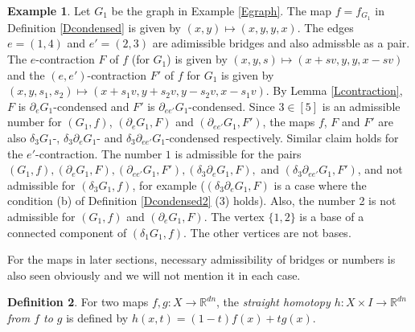 \documentclass[reqno]{amsart}
\theoremstyle{definition}
\newtheorem{defi}{Definition}[section]
\newtheorem{exa}[defi]{Example}
\theoremstyle{plain}
\newcommand{\RR}{\mathbb{R}}
\begin{document}
\begin{exa}\label{Ef_G}
Let $G_1$ be the graph in Example \ref{Egraph}.
The map $f=f_{G_1}$ in Definition \ref{Dcondensed} is given by $(x,y)\mapsto (x,y,y,x)$. The edges $e=(1,4)$ and $e'=(2,3)$ are adimissible bridges and also admissble as a pair. The $e$-contraction $F$ of $f$ (for $G_1$) is given by $(x,y,s)\mapsto (x+sv,y,y, x-sv)$ and the $(e,e')$-contraction $F'$ of $f$ for $G_1$ is given by $(x,y,s_1,s_2)\mapsto (x+s_1v, y+s_2v, y-s_2v, x-s_1v)$. By Lemma \ref{Lcontraction}, $F$  is  $\partial_eG_1$-condensed and $F'$ is $\partial_{ee'}G_1$-condensed.  
Since $3\in [5]$ is an admissible number for $(G_1,f)$, $(\partial_eG_1,F)$ and $(\partial_{ee'}G_1,F')$, the maps $f$, $F$ and $F'$ are also $\delta_3G_1$-, $\delta_3\partial_eG_1$- and  $\delta_3\partial_{ee'}G_1$-condensed respectively.  Similar claim holds for the $e'$-contraction. The number $1$ is admissible for the pairs $(G_1,f), (\partial_eG_1,F), (\partial_{ee'}G_1, F'), (\delta_3\partial_eG_1,F),$ and $(\delta_3\partial_{ee'}G_1,F')$,  and not admissible for $(\delta_3G_1,f)$, for example ($ (\delta_3\partial_eG_1,F)$ is a case where the condition (b) of Definition \ref{Dcondensed2} (3) holds). Also, the number 2 is not admissible for $(G_1,f)$ and $(\partial_eG_1,F)$.  The vertex $\{1,2\}$ is a base of a connected component of $(\delta_1G_1,f)$. The other vertices  are not bases. 





\end{exa}
For the maps in later sections, necessary admissibility of bridges or numbers is also seen obviously and we will not mention it in each case.  
\begin{defi}\label{Dstraight}
 For two  maps $f,g:X\to \RR^{dn}$, the 
{\em straight homotopy $h:X\times I\to \RR^{dn}$ from $f$ to $g$} is defined by
$h(x,t)=(1-t)f(x)+tg(x)$.
\end{defi}
\end{document}
